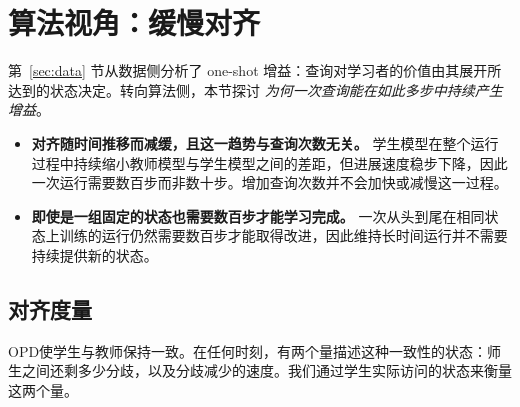\section{算法视角：缓慢对齐}
\label{sec:algorithm}

第~\ref{sec:data} 节从数据侧分析了 one-shot 增益：查询对学习者的价值由其展开所达到的状态决定。转向算法侧，本节探讨 \textit{为何一次查询能在如此多步中持续产生增益}。

\begin{tcolorbox}[takeawaysbox]
\begin{itemize}[topsep=0pt, partopsep=0pt, leftmargin=12pt, itemsep=0pt]
    \item  \textbf{对齐随时间推移而减缓，且这一趋势与查询次数无关。} 学生模型在整个运行过程中持续缩小教师模型与学生模型之间的差距，但进展速度稳步下降，因此一次运行需要数百步而非数十步。增加查询次数并不会加快或减慢这一过程。

    \item  \textbf{即使是一组固定的状态也需要数百步才能学习完成。}
    一次从头到尾在相同状态上训练的运行仍然需要数百步才能取得改进，因此维持长时间运行并不需要持续提供新的状态。
\end{itemize}
\end{tcolorbox}

\subsection{对齐度量}
\label{sec:rate-setup}

OPD使学生与教师保持一致。在任何时刻，有两个量描述这种一致性的状态：师生之间还剩多少分歧，以及分歧减少的速度。我们通过学生实际访问的状态来衡量这两个量。

